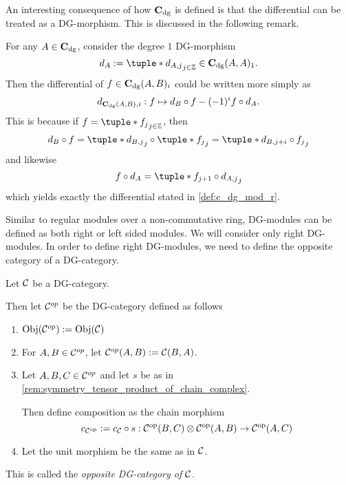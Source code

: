 An interesting consequence of how \( \operatorname{\mathbf{C}}_{\operatorname{dg}} \) is defined is that the differential can be treated as a DG-morphism. This is discussed in the following remark.
\begin{remark}
    \label{rem:c_dg_differential}
    For any \( A \in \operatorname{\mathbf{C}}_{\operatorname{dg}} \), consider the degree \( 1 \) DG-morphism
    \[
        d_A := \tuple*{ d_{A, j} }_{j \in \Zb} \in \C_{\dg}(A, A)_1.
    \]
    Then the differential of \( f \in \operatorname{\mathbf{C}}_{\operatorname{dg}}(A, B)_i \) could be written more simply as
    \[
        d_{\operatorname{\mathbf{C}}_{\operatorname{dg}}(A, B), i}: f \mapsto d_B \circ f - (-1)^i f \circ d_A.
    \]
    This is because if \( f = \tuple*{f_j}_{j \in \Zb} \), then
    \[
        d_B \circ f = \tuple*{d_{B, j} }_j \circ \tuple*{ f_j }_j = \tuple*{ d_{B, j + i} \circ f_j }_j
    \]
    and likewise
    \[
        f \circ d_A = \tuple*{f_{j + 1} \circ d_{A, j}}_j
    \]
    which yields exactly the differential stated in \autoref{def:c_dg_mod_r}.
\end{remark}

Similar to regular modules over a non-commutative ring, DG-modules can be defined as both right or left sided modules. We will consider only right DG-modules. In order to define right DG-modules, we need to define the opposite category of a DG-category.

\begin{definition}
    \label{def:opposite_dg_category}
    Let \( {\mathcal{C}} \) be a DG-category.

    Then let \( {\mathcal{C}}^{op} \) be the DG-category defined as follows
    \begin{enumerate}
        \item {
            \( \operatorname{Obj}({\mathcal{C}}^{op}) := \operatorname{Obj}({\mathcal{C}}) \)
        }
        \item {
            For \( A, B \in {\mathcal{C}}^{op} \), let \( {\mathcal{C}}^{op}(A, B) := {\mathcal{C}}(B, A) \).
        }
        \item {
            Let \( A, B, C \in {\mathcal{C}}^{op} \) and let \( s \) be as in \autoref{rem:symmetry_tensor_product_of_chain_complex}.
            
            Then define composition as the chain morphism
            \[
                c_{{\mathcal{C}}^{\operatorname{op}}} :=  c_{{\mathcal{C}}} \circ s: {\mathcal{C}}^{\operatorname{op}} (B, C) \otimes {\mathcal{C}}^{\operatorname{op}} (A, B) \to {\mathcal{C}}^{\operatorname{op}} (A, C)
            \]
        }
        \item {
            Let the unit morphism be the same as in \( {\mathcal{C}} \).
        }
    \end{enumerate}
    This is called the \emph{opposite DG-category of \( {\mathcal{C}} \)}.
\end{definition}


